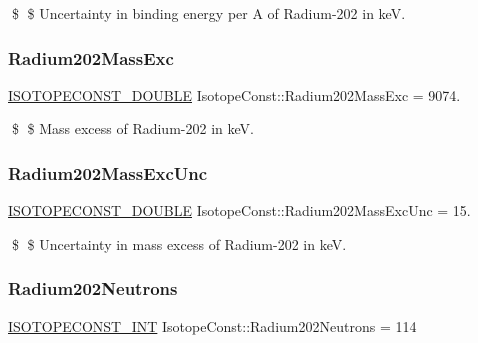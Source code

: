 \$ \$ Uncertainty in binding energy per A of Radium-\/202 in keV. \mbox{\label{group___isotope_const-_radium-_ra202_ga7d8cd450b9315aab87d7acba9160d040}} 
\subsubsection{\texorpdfstring{Radium202\+Mass\+Exc}{Radium202MassExc}}
{\footnotesize\ttfamily \mbox{\hyperlink{group___isotope_const-_macros_ga8f45a7272ce02c0b4c65c44636ed719a}{I\+S\+O\+T\+O\+P\+E\+C\+O\+N\+S\+T\+\_\+\+D\+O\+U\+B\+LE}} Isotope\+Const\+::\+Radium202\+Mass\+Exc = 9074.}

\$ \$ Mass excess of Radium-\/202 in keV. \mbox{\label{group___isotope_const-_radium-_ra202_ga08b24dc176ec17d79632e6b125161b31}} 
\subsubsection{\texorpdfstring{Radium202\+Mass\+Exc\+Unc}{Radium202MassExcUnc}}
{\footnotesize\ttfamily \mbox{\hyperlink{group___isotope_const-_macros_ga8f45a7272ce02c0b4c65c44636ed719a}{I\+S\+O\+T\+O\+P\+E\+C\+O\+N\+S\+T\+\_\+\+D\+O\+U\+B\+LE}} Isotope\+Const\+::\+Radium202\+Mass\+Exc\+Unc = 15.}

\$ \$ Uncertainty in mass excess of Radium-\/202 in keV. \mbox{\label{group___isotope_const-_radium-_ra202_ga26db4c64d562d5efdec74f8dc721a9d3}} 
\subsubsection{\texorpdfstring{Radium202\+Neutrons}{Radium202Neutrons}}
{\footnotesize\ttfamily \mbox{\hyperlink{group___isotope_const-_macros_ga5f18360b3e99483a35c32d789e62621c}{I\+S\+O\+T\+O\+P\+E\+C\+O\+N\+S\+T\+\_\+\+I\+NT}} Isotope\+Const\+::\+Radium202\+Neutrons = 114}

